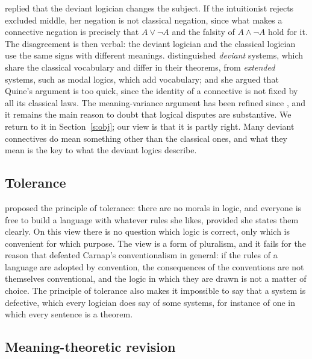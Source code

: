 \documentclass{situationist-preprint}
\begin{document}
\citet{Quine1970} replied that the deviant logician changes the subject. If the intuitionist rejects excluded middle, her negation is not classical negation, since what makes a connective negation is precisely that $A \vee \neg A$ and the falsity of $A \wedge \neg A$ hold for it. The disagreement is then verbal: the deviant logician and the classical logician use the same signs with different meanings. \citet{Haack1974} distinguished \emph{deviant} systems, which share the classical vocabulary and differ in their theorems, from \emph{extended} systems, such as modal logics, which add vocabulary; and she argued that Quine's argument is too quick, since the identity of a connective is not fixed by all its classical laws. The meaning-variance argument has been refined since \citep{Hjortland2013}, and it remains the main reason to doubt that logical disputes are substantive. We return to it in Section~\ref{s:obj}; our view is that it is partly right. Many deviant connectives do mean something other than the classical ones, and what they mean is the key to what the deviant logics describe.

\subsection{Tolerance}

\citet[\S 17]{Carnap1934} proposed the principle of tolerance: there are no morals in logic, and everyone is free to build a language with whatever rules she likes, provided she states them clearly. On this view there is no question which logic is correct, only which is convenient for which purpose. The view is a form of pluralism, and it fails for the reason that defeated Carnap's conventionalism in general: if the rules of a language are adopted by convention, the consequences of the conventions are not themselves conventional, and the logic in which they are drawn is not a matter of choice. The principle of tolerance also makes it impossible to say that a system is defective, which every logician does say of some systems, for instance of one in which every sentence is a theorem.

\subsection{Meaning-theoretic revision}
\end{document}
